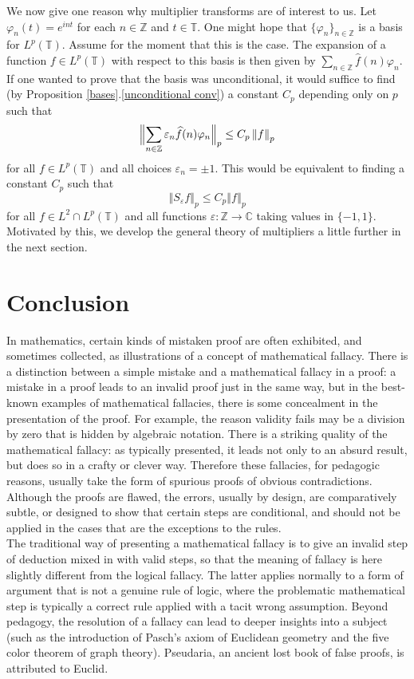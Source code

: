 \documentclass[12pt]{UNSWthesis}
\newcommand{\C}{\mathbb{C}}
\newcommand{\T}{\mathbb{T}}
\newcommand{\Z}{\mathbb{Z}}
\newcommand{\hatt}[1]{\widehat #1}
\newcommand{\reff}[2]{\ref{#1}.\ref{#2}}
\def\norm#1{\left \Vert #1 \right \Vert}
\def\snorm#1{\Bigl \Vert #1 \Bigr \Vert}
\numberwithin{equation}{section}
\begin{document}
We now give one reason why multiplier transforms are of interest to us.
Let $\varphi_n(t)=e^{int}$ for each $n\in\Z$ and $t\in\T$. One might hope that
$\{\varphi_n\}_{n\in\Z}$ is a basis for $L^p(\T)$. Assume for the moment that 
this is the case. The expansion of a
function $f\in L^p(\T)$ with respect to this basis is then given by
$\sum_{n\in\Z}\hatt{f}(n)\varphi_n$. 
If one wanted to prove that the basis was unconditional, it would suffice to
find (by Proposition \reff{bases}{unconditional conv}) a constant $C_p$
depending only on $p$ such that
\[\snorm{\sum_{n\in\Z}\varepsilon_n\hatt{f}(n)\varphi_n}_p\leq C_p\norm{f}_p\]
for all $f\in L^p(\T)$ and all choices
$\varepsilon_n=\pm 1$. This would be
equivalent to finding a constant $C_p$ such that
\[\norm{S_{\varepsilon}f}_p\leq C_p\norm{f}_p\]
for all $f\in L^2\cap L^p(\T)$ and all functions $\varepsilon:\Z\rightarrow\C$
taking values in $\{-1,1\}$. Motivated by this, we develop the general theory of
multipliers a little further in the next section.


\chapter{Conclusion}\label{ccl}

In mathematics, certain kinds of mistaken proof are often exhibited, and sometimes collected, as illustrations of a concept of mathematical fallacy. There is a distinction between a simple mistake and a mathematical fallacy in a proof: a mistake in a proof leads to an invalid proof just in the same way, but in the best-known examples of mathematical fallacies, there is some concealment in the presentation of the proof. For example, the reason validity fails may be a division by zero that is hidden by algebraic notation. There is a striking quality of the mathematical fallacy: as typically presented, it leads not only to an absurd result, but does so in a crafty or clever way. Therefore these fallacies, for pedagogic reasons, usually take the form of spurious proofs of obvious contradictions. Although the proofs are flawed, the errors, usually by design, are comparatively subtle, or designed to show that certain steps are conditional, and should not be applied in the cases that are the exceptions to the rules. \\

\noindent The traditional way of presenting a mathematical fallacy is to give an invalid step of deduction mixed in with valid steps, so that the meaning of fallacy is here slightly different from the logical fallacy. The latter applies normally to a form of argument that is not a genuine rule of logic, where the problematic mathematical step is typically a correct rule applied with a tacit wrong assumption. Beyond pedagogy, the resolution of a fallacy can lead to deeper insights into a subject (such as the introduction of Pasch's axiom of Euclidean geometry and the five color theorem of graph theory). Pseudaria, an ancient lost book of false proofs, is attributed to Euclid. \\
\end{document}
